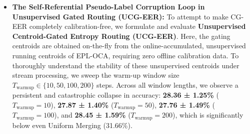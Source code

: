 \begin{itemize}
    \item \textbf{The Self-Referential Pseudo-Label Corruption Loop in Unsupervised Gated Routing (UCG-EER):} To attempt to make CG-EER completely calibration-free, we formulate and evaluate \textbf{Unsupervised Centroid-Gated Entropy Routing (UCG-EER)}. Here, the gating centroids are obtained on-the-fly from the online-accumulated, unsupervised running centroids of EPL-OCA, requiring zero offline calibration data. To thoroughly understand the stability of these unsupervised centroids under stream processing, we sweep the warm-up window size $T_{\text{warmup}} \in \{10, 50, 100, 200\}$ steps. Across all window lengths, we observe a persistent and catastrophic collapse in accuracy: \textbf{28.36 ± 1.25\%} ($T_{\text{warmup}}=10$), \textbf{27.87 ± 1.40\%} ($T_{\text{warmup}}=50$), \textbf{27.76 ± 1.49\%} ($T_{\text{warmup}}=100$), and \textbf{28.45 ± 1.59\%} ($T_{\text{warmup}}=200$), which is significantly below even Uniform Merging (31.66\%). 
    

\end{itemize}

